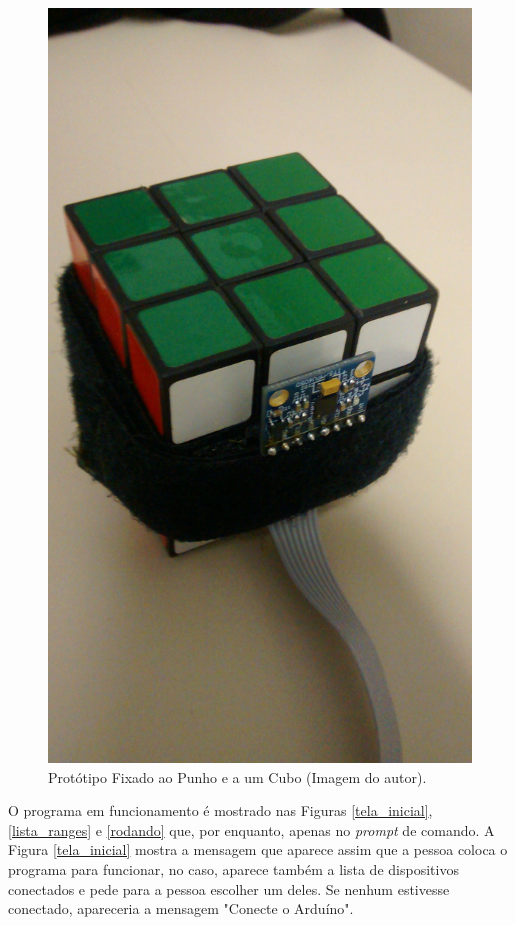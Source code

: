 \begin{figure}[h!]
	 		\includegraphics[keepaspectratio=true,scale=0.1]{figuras/prototipo_2_3.jpg}
	 		\caption{Protótipo Fixado ao Punho e a um Cubo (Imagem do autor).} 
	 		\label{prototipo3}	
	 	\end{figure}
	 
	O programa em funcionamento é mostrado nas Figuras \ref{tela_inicial}, \ref{lista_ranges} e \ref{rodando} que, por enquanto, apenas no \textit{prompt} de comando. A Figura \ref{tela_inicial} mostra a mensagem que aparece assim que a pessoa coloca o programa para funcionar, no caso, aparece também a lista de dispositivos conectados e pede para a pessoa escolher um deles. Se nenhum estivesse conectado, apareceria a mensagem "Conecte o Arduíno".
	
